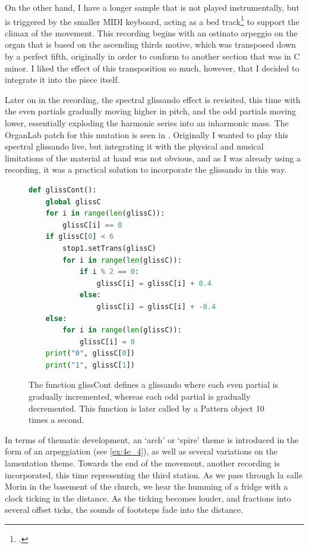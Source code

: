 \documentclass[12pt,twoside,maitrise]{dms_ks}
\theoremstyle{definition}
\begin{document}
{On the other hand, I have a longer sample that is not played instrumentally, but is triggered by the smaller MIDI keyboard, acting as a bed track\footcite[A bed track is a recording over which other elements are layered.][]{attariwala_re-imagining_2021} to support the climax of the movement. 
This recording begins with an ostinato arpeggio on the organ that is based on the ascending thirds motive, which was transposed down by a perfect fifth, originally in order to conform to another section that was in C minor. 
I liked the effect of this transposition so much, however, that I decided to integrate it into the piece itself. 

Later on in the recording, the spectral glissando effect is revisited, this time with the even partials gradually moving higher in pitch, and the odd partials moving lower, essentially exploding the harmonic series into an inharmonic mass. 
The OrganLab patch for this mutation is seen in .
Originally I wanted to play this spectral glissando live, but integrating it with the physical and musical limitations of the material at hand was not obvious, and as I was already using a recording, it was a practical solution to incorporate the glissando in this way.

\begin{figure}[H]
\begin{lstlisting}[language=Python]
def glissCont():
    global glissC
    for i in range(len(glissC)):
        glissC[i] == 0
    if glissC[0] < 6
        stop1.setTrans(glissC)
        for i in range(len(glissC)):
            if i % 2 == 0:
                glissC[i] = glissC[i] + 0.4
            else:
                glissC[i] = glissC[i] + -0.4
    else:
        for i in range(len(glissC)):
            glissC[i] = 0
    print("0", glissC[0])
    print("1", glissC[1])
\end{lstlisting}
\caption{The function glissCont defines a glissando where each even partial is gradually incremented, whereas each odd partial is gradually decremented. This function is later called by a Pattern object 10 times a second.}
\label{fig:glisscont}
\end{figure}

In terms of thematic development, an `arch' or `spire' theme is introduced in the form of an arpeggiation (see \cref{ex:4e_4}), as well as several variations on the lamentation theme.
Towards the end of the movement, another recording is incorporated, this time representing the third station.
As we pass through la salle Morin in the basement of the church, we hear the humming of a fridge with a clock ticking in the distance. As the ticking becomes louder, and fractions into several offset ticks, the sounds of footsteps fade into the distance.

}
\end{document}
